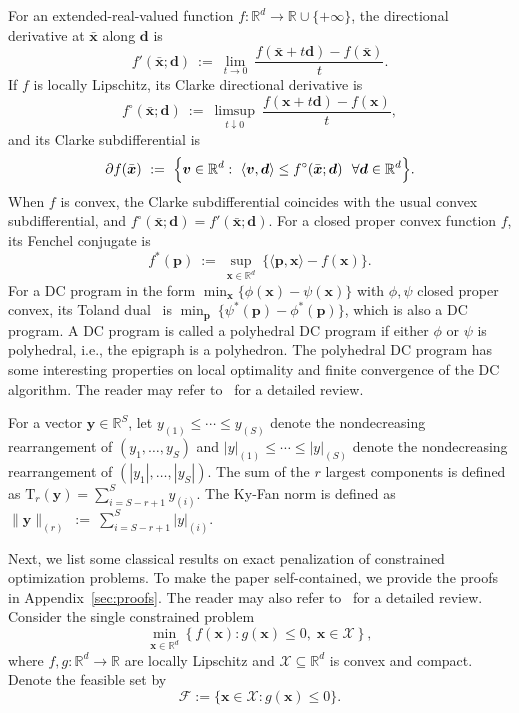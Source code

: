 \documentclass[11pt]{article}
\def\bs{\boldsymbol}
\def\Re{\mathbb{R}}
\def\X{\mathcal{X}}
\def\kyfan{\mathrm{T}}
\begin{document}
For an extended-real-valued function $f:\Re^d\to\Re\cup\{+\infty\}$, the  directional derivative at $\bar{\bs{x}}$ along $\bs{d}$ is
\[
f'(\bar{\bs{x}};\bs{d})\ :=\ \lim_{t\to 0}\ \frac{f(\bar{\bs{x}}+t\bs{d})-f(\bar{\bs{x}})}{t}.
\]
If $f$ is locally Lipschitz, its Clarke directional derivative is
\[
f^\circ(\bar{\bs{x}};\bs{d})\ :=\ \limsup_{t\downarrow 0}\ \frac{f(\bs{x}+t\bs{d})-f(\bs{x})}{t},
\]
and its Clarke subdifferential is
\[
\partial f(\bar{\bs{x}})
\ :=\ 
\Bigl\{\bs{v}\in\Re^d:\ \langle \bs{v},\bs{d}\rangle\le f^\circ(\bar{\bs{x}};\bs{d})\ \ \forall \bs{d}\in\Re^d\Bigr\}.
\]
When $f$ is convex, the Clarke subdifferential coincides with the usual convex subdifferential, and $f^\circ(\bar{\bs{x}};\bs{d})=f'(\bar{\bs{x}};\bs{d})$. For a closed proper convex function $f$, its Fenchel conjugate is
\[
f^*(\bs{p})\ :=\ \sup_{\bs{x}\in\Re^d}\ \bigl\{\langle \bs{p},\bs{x}\rangle-f(\bs{x})\bigr\}.
\]
For a DC program in the form $\min_{\bs{x}}\{\phi(\bs{x})-\psi(\bs{x})\}$ with $\phi,\psi$ closed proper convex, its Toland dual~\cite{toland1978duality} is $\min_{\bs{p}}\ \{\psi^*(\bs{p})-\phi^*(\bs{p})\}$, which is also a DC program. A DC program is called a polyhedral DC program if either $\phi$ or $\psi$ is polyhedral, i.e., the epigraph is a polyhedron. The polyhedral DC program has some interesting properties on local optimality and finite convergence of the DC algorithm. The reader may refer to~\cite{tao1997convex} for a detailed review.

For a vector $\bs{y}\in\Re^S$, let $y_{(1)}\le\cdots\le y_{(S)}$ denote the nondecreasing rearrangement of $(y_1,\ldots,y_S)$ and $|y|_{(1)}\le\cdots\le |y|_{(S)}$ denote the nondecreasing rearrangement of $(|y_1|,\ldots,|y_S|)$. The sum of the $r$ largest components is defined as $\kyfan_r(\bs{y}) = \sum_{i=S-r+1}^S y_{(i)}$. The Ky-Fan norm is defined as $\|\bs{y}\|_{(r)}\ :=\ \sum_{i=S-r+1}^S |y|_{(i)}$. 

Next, we list some classical results on exact penalization of constrained optimization problems. To make the paper self-contained, we provide the proofs in Appendix~\ref{sec:proofs}. The reader may also refer to~\cite{burke1991exact} for a detailed review. Consider the single constrained problem
\begin{equation} \label{p:prelim-constrained}
\min_{\bs{x} \in \Re^d} \left\{ f(\bs{x}) : g(\bs{x}) \leq 0, \; \bs{x} \in \X\right\},
\end{equation}
where $f,g:\Re^d\to\Re$ are locally Lipschitz and $\X\subseteq\Re^d$ is convex and compact.
Denote the feasible set by
\[
\mathcal{F}:=\{\bs{x}\in\X: g(\bs{x})\le 0\}.
\]
\end{document}
